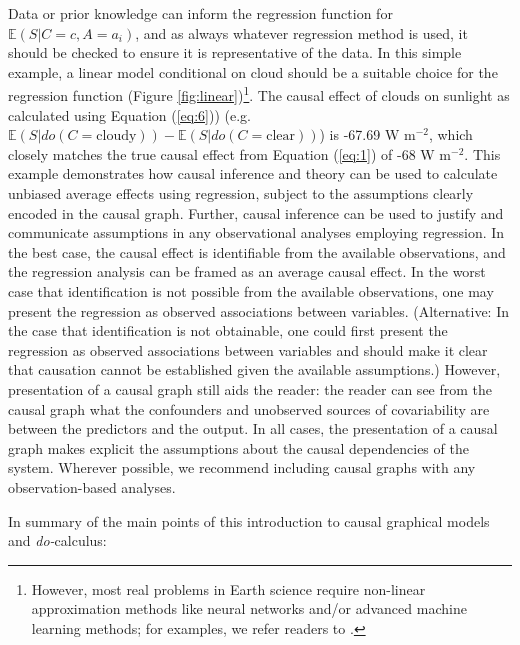 \documentclass[12pt]{article}
\begin{document}
Data or prior knowledge can inform the regression function for
$\mathbb{E}(S | C=c, A=a_i)$, and as always whatever regression method
is used, it should be checked to ensure it is representative of the
data. In this simple example, a linear model conditional on cloud
should be a suitable choice for the regression function (Figure
\ref{fig:linear})\footnote{However, most real problems in Earth
  science require non-linear approximation methods like neural
  networks and/or advanced machine learning methods; for examples, we
  refer readers to \citep{bishop2006pattern}.}. The causal effect of
clouds on sunlight as calculated using Equation (\ref{eq:6})) (e.g.
$\mathbb{E}(S | do(C = \text{cloudy})) - \mathbb{E}(S | do(C =
\text{clear}))$) is -67.69 W m$^{-2}$, which closely matches the true
causal effect from Equation (\ref{eq:1}) of -68 W m$^{-2}$. This
example demonstrates how causal inference and theory can be used to
calculate unbiased average effects using regression, subject to the
assumptions clearly encoded in the causal graph. Further, causal
inference can be used to justify and communicate assumptions in any
observational analyses employing regression. In the best case, the
causal effect is identifiable from the available observations, and the
regression analysis can be framed as an average causal effect. In the worst case that identification is not possible
from the available observations, one may present the regression as
observed associations between variables. (Alternative: In the
case that identification is not obtainable, one could first present
the regression as observed associations between variables and should
make it clear that causation cannot be established given the available
assumptions.) However, presentation of a
causal graph still aids the reader: the reader can see from the causal
graph what the confounders and unobserved sources of covariability are
between the predictors and the output. In all cases, the presentation
of a causal graph makes explicit the assumptions about the causal
dependencies of the system. Wherever possible, we recommend including
causal graphs with any observation-based analyses.

In summary of the main points of this introduction to causal graphical
models and \textit{do-}calculus:
\end{document}
